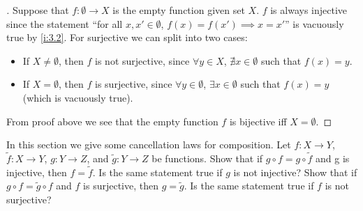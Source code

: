 \begin{proof}[]
  Suppose that \(f : \emptyset \to X\) is the empty function given set \(X\).
  \(f\) is always injective since the statement ``for all \(x, x' \in \emptyset\), \(f(x) = f(x') \implies x = x'\)'' is vacuously true by \cref{i:3.2}.
  For surjective we can split into two cases:
  \begin{itemize}
    \item If \(X \neq \emptyset\), then \(f\) is not surjective, since \(\forall y \in X\), \(\nexists x \in \emptyset\) such that \(f(x) = y\).
    \item If \(X = \emptyset\), then \(f\) is surjective, since \(\forall y \in \emptyset\), \(\exists x \in \emptyset\) such that \(f(x) = y\) (which is vacuously true).
  \end{itemize}
  From proof above we see that the empty function \(f\) is bijective iff \(X = \emptyset\).
\end{proof}

\begin{ex}\label{i:ex:3.3.4}
  In this section we give some cancellation laws for composition.
  Let \(f : X \to Y\), \(\tilde{f} : X \to Y\), \(g : Y \to Z\), and \(\tilde{g} : Y \to Z\) be functions.
  Show that if \(g \circ f = g \circ \tilde{f}\) and g is injective, then \(f = \tilde{f}\).
  Is the same statement true if \(g\) is not injective?
  Show that if \(g \circ f = \tilde{g} \circ f\) and \(f\) is surjective, then \(g = \tilde{g}\).
  Is the same statement true if \(f\) is not surjective?
\end{ex}

